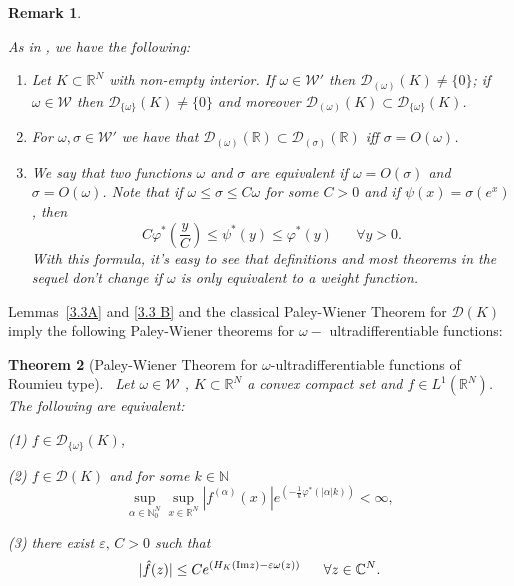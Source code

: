 \documentclass[twoside]{amsart}
\newtheorem{Th}{Theorem}[section]
\newtheorem{Rem}[Th]{Remark}
\begin{document}
\begin{Rem}
  \label{rem218}
\begin{em}
As in \cite{BMT}, we have the following:
\begin{enumerate}
\item
  Let $K\subset\mathbb{R}^{N}$ with non-empty interior.
  If $\omega\in{\mathcal{W}}'$ then ${\mathcal{D}}_{(\omega)}(K)\neq\{0\}$;
  if $\omega\in{\mathcal{W}}$ then ${\mathcal{D}}_{\{\omega\}}(K)\neq\{0\}$ and moreover
  ${\mathcal{D}}_{(\omega)}(K)\subset{\mathcal{D}}_{\{\omega\}}(K)$.
\item
For $\omega,\sigma\in{\mathcal{W}}'$ we have that 
${\mathcal{D}}_{(\omega)}(\mathbb{R})\subset{\mathcal{D}}_{(\sigma)}(\mathbb{R})$
iff $\sigma=O(\omega)$.
\item
We say that two functions $\omega$ and $\sigma$ are equivalent if
$\omega=O(\sigma)$ and $\sigma=O(\omega)$. Note that if 
$\omega\leq\sigma\leq C\omega$
for some $C>0$ and if $\psi(x)=\sigma(e^{x})$, then
\[
C\varphi^{*}\left(\frac{y}{C}\right)\leq\psi^{*}(y)\leq
\varphi^{*}(y)\,\,\,\,\,\,\,\,\,\,\forall y>0.
\]
With this formula, it's easy to see that definitions and most theorems
in the sequel don't change if $\omega$ is only equivalent to a weight
function.
\end{enumerate}
\end{em}
\end{Rem}

Lemmas~\ref{3.3A} and \ref{3.3 B} and the classical Paley-Wiener Theorem
for ${\mathcal{D}}(K)$ imply the following Paley-Wiener theorems for $\omega-$
ultradifferentiable functions:
\begin{Th}[Paley-Wiener Theorem for $\omega$-ultradifferentiable
functions of Roumieu type]
\label{prop:2.3.5}
\ 
Let
$\omega\in{\mathcal{W}}$ , $K\subset\mathbb{R}^{N}$ a convex compact set and
$f\in L^{1}(\mathbb{R}^{N})$.
The following are equivalent:

(1) $f\in{\mathcal{D}}_{\{\omega\}}(K)$, 

(2) $f\in{\mathcal{D}}(K)$ and for some $k\in\mathbb{N}$
\[
\underset{\alpha\in\mathbb{N}_{0}^{N}}{\sup}
\underset{x\in\mathbb{R}^{N}}{\sup}|f^{(\alpha)}(x)|
e^{\left(-\frac{1}{k}\varphi^{*}(|\alpha|k)\right)}<\infty,
\]

(3) there exist $\varepsilon,\,C>0$ such that 
\[
|\hat{f}(z)|\leq Ce^{\left(H_{K}({\mathop{\rm Im}\nolimits} z)-\varepsilon\omega(z)\right)}
\,\,\,\,\,\,\,\,\,\,\forall z\in\mathbb{C}^{N}.
\]
\end{Th}
\end{document}
